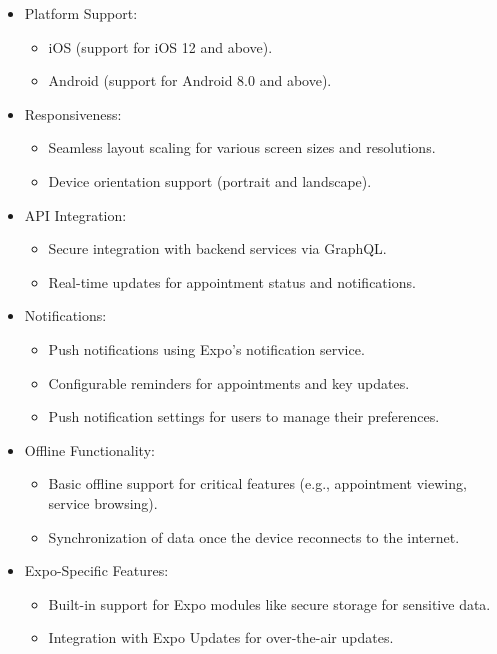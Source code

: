 \begin{itemize}  
    \item Platform Support:  
        \begin{itemize}  
            \item iOS (support for iOS 12 and above).  
            \item Android (support for Android 8.0 and above).  
        \end{itemize}  
    \item Responsiveness:  
        \begin{itemize}  
            \item Seamless layout scaling for various screen sizes and resolutions.  
            \item Device orientation support (portrait and landscape).  
        \end{itemize}  
    \item API Integration:  
        \begin{itemize}  
            \item Secure integration with backend services via GraphQL.  
            \item Real-time updates for appointment status and notifications.  
        \end{itemize}  
    \item Notifications:  
        \begin{itemize}  
            \item Push notifications using Expo’s notification service.  
            \item Configurable reminders for appointments and key updates.  
            \item Push notification settings for users to manage their preferences.  
        \end{itemize}  
    \item Offline Functionality:  
        \begin{itemize}  
            \item Basic offline support for critical features (e.g., appointment viewing, service browsing).  
            \item Synchronization of data once the device reconnects to the internet.  
        \end{itemize}  
    \item Expo-Specific Features:  
        \begin{itemize}  
            \item Built-in support for Expo modules like secure storage for sensitive data.  
            \item Integration with Expo Updates for over-the-air updates.  
        \end{itemize}  
\end{itemize}  

